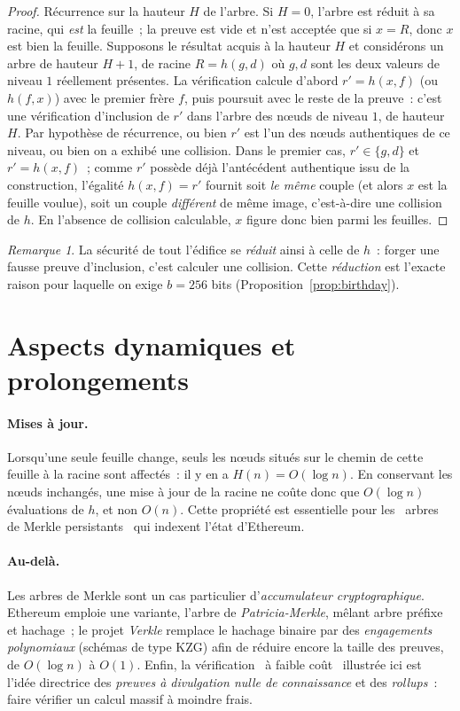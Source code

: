 \documentclass[11pt,a4paper]{article}
\theoremstyle{definition}\newtheorem{definition}{Définition}
\theoremstyle{plain}\newtheorem{theoreme}{Théorème}\newtheorem{proposition}{Proposition}\newtheorem{lemme}{Lemme}
\theoremstyle{remark}\newtheorem{remarque}{Remarque}
\begin{document}
\begin{proof}
Récurrence sur la hauteur $H$ de l'arbre. Si $H = 0$, l'arbre est réduit à sa racine, qui
\emph{est} la feuille~; la preuve est vide et n'est acceptée que si $x = R$, donc $x$ est bien la
feuille. Supposons le résultat acquis à la hauteur $H$ et considérons un arbre de hauteur $H+1$,
de racine $R = h(g, d)$ où $g, d$ sont les deux valeurs de niveau $1$ réellement présentes. La
vérification calcule d'abord $r' = h(x, f)$ (ou $h(f, x)$) avec le premier frère $f$, puis
poursuit avec le reste de la preuve~: c'est une vérification d'inclusion de $r'$ dans l'arbre des
n\oe uds de niveau $1$, de hauteur $H$. Par hypothèse de récurrence, ou bien $r'$ est l'un des
n\oe uds authentiques de ce niveau, ou bien on a exhibé une collision. Dans le premier cas,
$r' \in \{g, d\}$ et $r' = h(x, f)$~; comme $r'$ possède déjà l'antécédent authentique issu de la
construction, l'égalité $h(x,f) = r'$ fournit soit \emph{le même} couple (et alors $x$ est la
feuille voulue), soit un couple \emph{différent} de même image, c'est-à-dire une collision de $h$.
En l'absence de collision calculable, $x$ figure donc bien parmi les feuilles.
\end{proof}

\begin{remarque}
La sécurité de tout l'édifice se \emph{réduit} ainsi à celle de $h$~: forger une fausse preuve
d'inclusion, c'est calculer une collision. Cette \emph{réduction} est l'exacte raison pour
laquelle on exige $b = 256$ bits (Proposition~\ref{prop:birthday}).
\end{remarque}

\section{Aspects dynamiques et prolongements}

\paragraph{Mises à jour.} Lorsqu'une seule feuille change, seuls les n\oe uds situés sur le
chemin de cette feuille à la racine sont affectés~: il y en a $H(n) = O(\log n)$. En conservant
les n\oe uds inchangés, une mise à jour de la racine ne coûte donc que $O(\log n)$ évaluations de
$h$, et non $O(n)$. Cette propriété est essentielle pour les \guillemotleft~arbres de Merkle
persistants~\guillemotright{} qui indexent l'état d'Ethereum.

\paragraph{Au-delà.} Les arbres de Merkle sont un cas particulier d'\emph{accumulateur
cryptographique}. Ethereum emploie une variante, l'arbre de \emph{Patricia-Merkle}, mêlant arbre
préfixe et hachage~; le projet \emph{Verkle} remplace le hachage binaire par des \emph{engagements
polynomiaux} (schémas de type KZG) afin de réduire encore la taille des preuves, de $O(\log n)$ à
$O(1)$. Enfin, la vérification \guillemotleft~à faible coût~\guillemotright{} illustrée ici est
l'idée directrice des \emph{preuves à divulgation nulle de connaissance} et des \emph{rollups}~:
faire vérifier un calcul massif à moindre frais.
\end{document}
